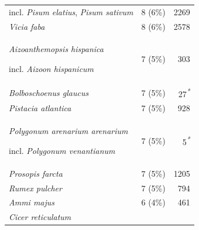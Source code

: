 \documentclass[
  number,
  review]{elsarticle}
\begin{document}
\begin{table}
{\begin{tabular*}{\linewidth}{@{\extracolsep{\fill}}lrr}
incl. \emph{Pisum elatius}, \emph{Pisum sativum} & 8 (6\%) & 2269 \\ 
\emph{Vicia faba} & 8 (6\%) & 2578 \\ 
\emph{Aizoanthemopsis hispanica}

incl. \emph{Aizoon hispanicum} & 7 (5\%) & 303 \\ 
\emph{Bolboschoenus glaucus} & 7 (5\%) & 27\textsuperscript{\textit{*}} \\ 
\emph{Pistacia atlantica} & 7 (5\%) & 928 \\ 
\emph{Polygonum arenarium arenarium}

incl. \emph{Polygonum venantianum} & 7 (5\%) & 5\textsuperscript{\textit{*}} \\ 
\emph{Prosopis farcta} & 7 (5\%) & 1205 \\ 
\emph{Rumex pulcher} & 7 (5\%) & 794 \\ 
\emph{Ammi majus} & 6 (4\%) & 461 \\ 
\emph{Cicer reticulatum}


\end{tabular*}}
\end{table}
\end{document}
